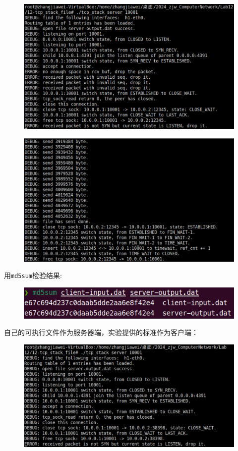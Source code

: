 \documentclass[UTF8]{report}
\begin{document}
\begin{figure}[H]
    \centering
    \includegraphics[width=.75\textwidth]{my_server_my_client_file_h1.png}
\end{figure}

\begin{figure}[H]
    \centering
    \includegraphics[width=.75\textwidth]{my_server_my_client_file_h2.png}
\end{figure}

用\texttt{md5sum}检验结果:

\begin{figure}[H]
    \centering
    \includegraphics[width=.75\textwidth]{my_server_my_client_file_md5sum.png}
\end{figure}

自己的可执行文件作为服务器端，实验提供的标准作为客户端：

\begin{figure}[H]
    \centering
    \includegraphics[width=.75\textwidth]{my_server_std_client_file_h1.png}
\end{figure}
\end{document}
